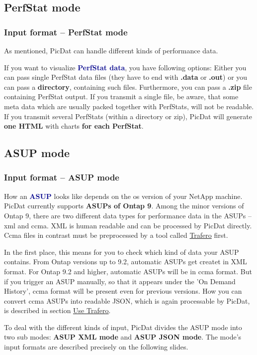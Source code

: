 \documentclass[8pt]{beamer}
\begin{document}
\subsection{PerfStat mode}
\begin{frame}
\frametitle{Input format -- PerfStat mode}
As mentioned, PicDat can handle different kinds of performance data.
\bigskip

If you want to visualize \textcolor{darkblue}{\textbf{PerfStat data}}, you have following options: Either you can pass single PerfStat data files (they have to end with \textbf{.data} or \textbf{.out}) or you can pass a \textbf{directory}, containing such files. Furthermore, you can pass a \textbf{.zip} file containing PerfStat output. If you transmit a single file, be aware, that some meta data which are usually packed together with PerfStats, will not be readable. If you transmit several PerfStats (within a directory or zip), PicDat will generate \textbf{one HTML} with charts \textbf{for each PerfStat}. 
\end{frame}

\subsection{ASUP mode}

\begin{frame}
\frametitle{Input format -- ASUP mode}
How an \textcolor{darkblue}{\textbf{ASUP}} looks like depends on the os version of your NetApp machine. PicDat currently supports \textbf{ASUPs of Ontap 9}. Among the minor versions of Ontap 9, there are two different data types for performance data in the ASUPs -- xml and ccma. XML is human readable and can be processed by PicDat directly. Ccma files in contrast must be preprocessed by a tool called \hyperref[trafero]{Trafero} first.
\bigskip

In the first place, this means for you to check which kind of data your ASUP contains. From Ontap versions up to 9.2, automatic ASUPs get createt in XML format. For Ontap 9.2 and higher, automatic ASUPs will be in ccma format. But if you trigger an ASUP manually, so that it appears under the 'On Demand History', ccma format will be present even for previous versions. How you can convert ccma ASUPs into readable JSON, which is again processable by PicDat, is described in section \hyperref[trafero]{\underline{Use Trafero}}.

To deal with the different kinds of input, PicDat divides the ASUP mode into two sub modes: \textbf{ASUP XML mode} and \textbf{ASUP JSON mode}. The mode's input formats are described precisely on the following slides.
\end{frame}
\end{document}
